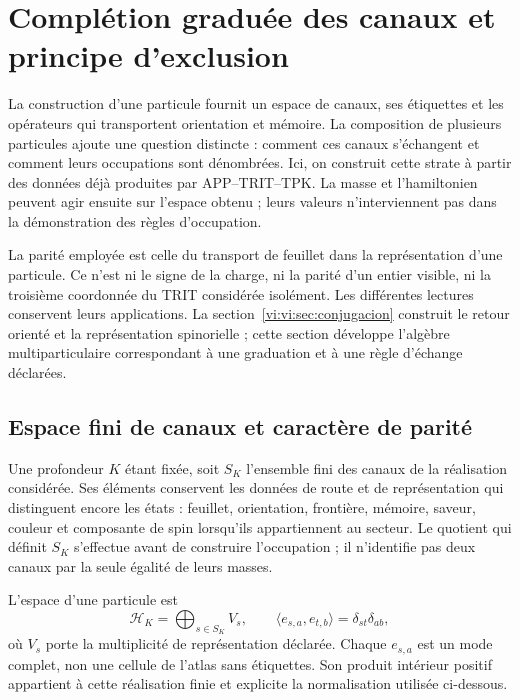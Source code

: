 \section{Complétion graduée des canaux et principe d’exclusion}
\label{vi:vi:sec:fock-pauli}

La construction d’une particule fournit un espace de canaux, ses
étiquettes et les opérateurs qui transportent orientation et mémoire. La
composition de plusieurs particules ajoute une question distincte : comment
ces canaux s’échangent et comment leurs occupations sont dénombrées. Ici,
on construit cette strate à partir des données déjà produites par
APP--TRIT--TPK. La masse et l’hamiltonien peuvent agir ensuite sur
l’espace obtenu ; leurs valeurs n’interviennent pas dans la démonstration des
règles d’occupation.

La parité employée est celle du transport de feuillet dans la représentation
d’une particule. Ce n’est ni le signe de la charge, ni la parité d’un entier
visible, ni la troisième coordonnée du TRIT considérée isolément.
Les différentes lectures conservent leurs applications. La
section~\ref{vi:vi:sec:conjugacion} construit le retour orienté et la
représentation spinorielle ; cette section développe l’algèbre
multiparticulaire correspondant à une graduation et à une règle
d’échange déclarées.

\subsection{Espace fini de canaux et caractère de parité}
\label{vi:vi:subsec:canales-graduados}

Une profondeur \(K\) étant fixée, soit \(S_K\) l’ensemble fini des
canaux de la réalisation considérée. Ses éléments conservent les
données de route et de représentation qui distinguent encore les états :
feuillet, orientation, frontière, mémoire, saveur, couleur et composante de
spin lorsqu’ils appartiennent au secteur. Le quotient qui définit \(S_K\)
s’effectue avant de construire l’occupation ; il n’identifie pas deux canaux
par la seule égalité de leurs masses.

L’espace d’une particule est
\begin{equation}
 \mathcal H_K=\bigoplus_{s\in S_K}V_s,
 \qquad\langle e_{s,a},e_{t,b}\rangle=\delta_{st}\delta_{ab},
 \label{vi:vi:eq:espacio-canales-fock}
\end{equation}
où \(V_s\) porte la multiplicité de représentation déclarée.
Chaque \(e_{s,a}\) est un mode complet, non une cellule de l’atlas sans
étiquettes. Son produit intérieur positif appartient à cette réalisation
finie et explicite la normalisation utilisée ci-dessous.

